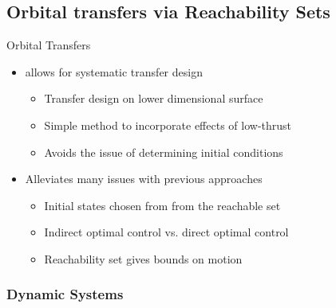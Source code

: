 \subsection[Reachability Sets]{Orbital transfers via Reachability Sets}

\begin{frame}{Orbital Transfers} %
    \begin{itemize}
        \item {} allows for systematic transfer design
        \begin{itemize}
            \item Transfer design on lower dimensional \Poincare surface
            \item Simple method to incorporate effects of low-thrust 
            \item Avoids the issue of determining initial conditions
        \end{itemize}
    \pause
        \item Alleviates many issues with previous approaches
        \begin{itemize}
            \item Initial states chosen from from the reachable set
            \item Indirect optimal control vs. direct optimal control
            \item Reachability set gives bounds on motion
        \end{itemize}    
    \end{itemize}

\end{frame} %

\subsubsection[Dynamic Systems Theory Review]{Dynamic Systems}

